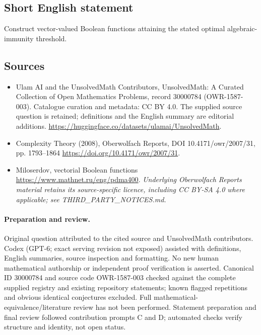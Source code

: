 \documentclass[11pt]{article}
\begin{document}
\subsection{Short English statement}
Construct vector-valued Boolean functions attaining the stated optimal algebraic-immunity threshold.
\subsection{Sources}
\begin{itemize}
\item[\hypertarget{source:30000784:1}{S1}] Ulam AI and the UnsolvedMath Contributors, UnsolvedMath: A Curated Collection of Open Mathematics Problems, record 30000784 (OWR-1587-003). Catalogue curation and metadata: CC BY 4.0. The supplied source question is retained; definitions and the English summary are editorial additions.
\url{https://huggingface.co/datasets/ulamai/UnsolvedMath}.
\item[\hypertarget{source:30000784:2}{S2}] Complexity Theory (2008), Oberwolfach Reports, DOI 10.4171/owr/2007/31, pp. 1793--1864
\url{https://doi.org/10.4171/owr/2007/31}.
\item[\hypertarget{source:30000784:3}{S3}] Miloserdov, vectorial Boolean functions
\url{https://www.mathnet.ru/eng/pdma400}.
\textit{Underlying Oberwolfach Reports material retains its source-specific licence, including CC BY-SA 4.0 where applicable; see THIRD\_PARTY\_NOTICES.md.}
\end{itemize}
\paragraph{Preparation and review.}
Original question attributed to the cited source and UnsolvedMath contributors. Codex (GPT-6; exact serving revision not exposed) assisted with definitions, English summaries, source inspection and formatting. No new human mathematical authorship or independent proof verification is asserted. Canonical ID 30000784 and source code OWR-1587-003 checked against the complete supplied registry and existing repository statements; known flagged repetitions and obvious identical conjectures excluded. Full mathematical-equivalence/literature review has not been performed. Statement preparation and final review followed contribution prompts C and D; automated checks verify structure and identity, not open status.
\label{end:30000784}
\end{document}
